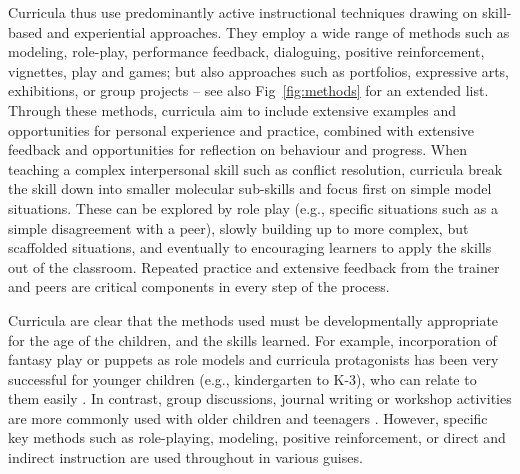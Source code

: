 \documentclass[prodmode,acmtochi]{acmsmall}
\begin{document}

  

Curricula thus use predominantly active instructional techniques drawing on skill-based and experiential approaches. They employ a wide range of methods such as modeling, role-play, performance feedback, dialoguing, positive reinforcement, vignettes, play and games; but also approaches such as portfolios, expressive arts, exhibitions, or group projects -- see also Fig~\ref{fig:methods} for an extended list. Through these methods, curricula aim to include extensive examples and opportunities for personal experience and practice, combined with extensive feedback and opportunities for reflection on behaviour and progress. When teaching a complex interpersonal skill such as conflict resolution, curricula break the skill down into smaller molecular sub-skills and focus first on simple model situations. These can be explored by role play (e.g., specific situations such as a simple disagreement with a peer), slowly building up to more complex, but scaffolded situations, and eventually to encouraging learners to apply the skills out of the classroom. Repeated practice and extensive feedback from the trainer and peers are critical components in every step of the process. 

Curricula are clear that the methods used must be developmentally appropriate for the age of the children, and the skills learned. For example, incorporation of fantasy play or puppets as role models and curricula protagonists has been very successful for younger children (e.g., kindergarten to K-3), who can relate to them easily  \cite{Webster-Stratton2004}. In contrast, group discussions, journal writing or workshop activities are more commonly used with older children and teenagers \cite{dejong1994}. However, specific key methods such as role-playing, modeling, positive reinforcement, or direct and indirect instruction are used throughout in various guises. 
\end{document}
